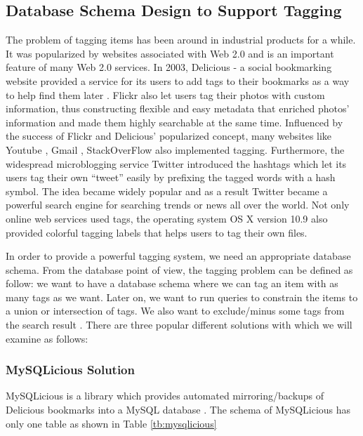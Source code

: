 \subsection{Database Schema Design to Support Tagging}\label{databasedesign}
The problem of tagging items has been around in industrial products for a while. It was popularized by websites associated with Web 2.0 and is an important feature of many Web 2.0 services. In 2003, Delicious - a social bookmarking website provided a service for its users to add tags to their bookmarks as a way to help find them later \cite{delicious}. Flickr \cite{flickr} also let users tag their photos with custom information, thus constructing flexible and easy metadata that enriched photos' information and made them highly searchable at the same time. Influenced by the success of Flickr and Delicious' popularized concept, many websites like Youtube \cite{youtube}, Gmail \cite{gmail}, StackOverFlow \cite{stackoverflow} also implemented tagging. Furthermore, the widespread microblogging service Twitter \cite{twitter} introduced the hashtags which let its users tag their own ``tweet'' easily by prefixing the tagged words with a hash symbol. The idea became widely popular and as a result Twitter became a powerful search engine for searching trends or news all over the world. Not only online web services used tags, the operating system OS X version 10.9 also provided colorful tagging labels \cite{osxtag} that helps users to tag their own files.

In order to provide a powerful tagging system, we need an appropriate database schema. From the database point of view, the tagging problem can be defined as follow: we want to have a database schema where we can tag an item with as many tags as we want. Later on, we want to run queries to constrain the items to a union or intersection of tags. We also want to exclude\slash minus some tags from the search result \cite{puitag}. There are three popular different solutions with which we will examine as follows:

\subsubsection{MySQLicious Solution}
MySQLicious is a library which provides automated mirroring/backups of Delicious bookmarks into a MySQL database \cite{mysqlicious}. The schema of MySQLicious has only one table as shown in Table \ref{tb:mysqlicious}

